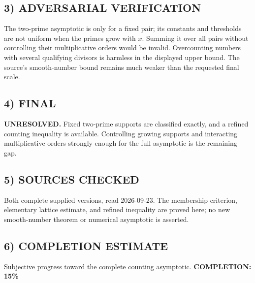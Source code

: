 \subsection*{3) ADVERSARIAL VERIFICATION}
The two-prime asymptotic is only for a fixed pair; its constants and thresholds are not uniform when the primes grow with $x$. Summing it over all pairs without controlling their multiplicative orders would be invalid. Overcounting numbers with several qualifying divisors is harmless in the displayed upper bound. The source's smooth-number bound remains much weaker than the requested final scale.
\subsection*{4) FINAL}
\textbf{UNRESOLVED.} Fixed two-prime supports are classified exactly, and a refined counting inequality is available. Controlling growing supports and interacting multiplicative orders strongly enough for the full asymptotic is the remaining gap.
\subsection*{5) SOURCES CHECKED}
Both complete supplied versions, read 2026-09-23. The membership criterion, elementary lattice estimate, and refined inequality are proved here; no new smooth-number theorem or numerical asymptotic is asserted.
\subsection*{6) COMPLETION ESTIMATE}
Subjective progress toward the complete counting asymptotic.
\textbf{COMPLETION: 15\%}
